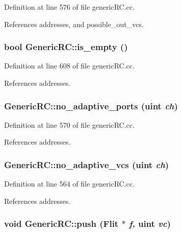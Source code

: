 Definition at line 576 of file genericRC.cc.

References addresses, and possible\_\-out\_\-vcs.
\subsubsection[{is\_\-empty}]{\setlength{\rightskip}{0pt plus 5cm}bool GenericRC::is\_\-empty ()}\label{classGenericRC_5fc891e7753c5e06cd3599b11bab60a6}




Definition at line 608 of file genericRC.cc.

References addresses.
\subsubsection[{no\_\-adaptive\_\-ports}]{ GenericRC::no\_\-adaptive\_\-ports ({\bf uint} {\em ch})}\label{classGenericRC_cdaa274e26d50e436f03dc1fd01eecda}




Definition at line 570 of file genericRC.cc.

References addresses.
\subsubsection[{no\_\-adaptive\_\-vcs}]{ GenericRC::no\_\-adaptive\_\-vcs ({\bf uint} {\em ch})}\label{classGenericRC_5bc55efc9f109d31c8c12d7717da532b}




Definition at line 564 of file genericRC.cc.

References addresses.
\subsubsection[{push}]{\setlength{\rightskip}{0pt plus 5cm}void GenericRC::push ({\bf Flit} $\ast$ {\em f}, \/  {\bf uint} {\em vc})}\label{classGenericRC_90ab6829a72d3b4628b387f175a400bd}




